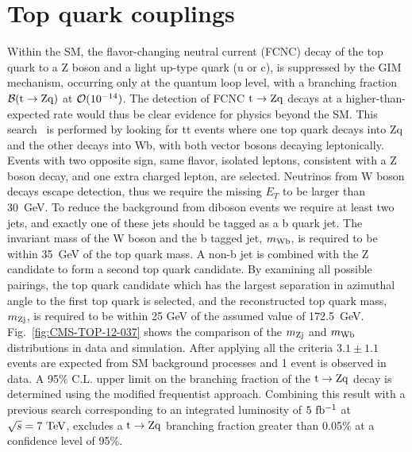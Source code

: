 \documentclass[a4paper]{PoS}
\begin{document}
\section{Top quark couplings}

Within the SM, the flavor-changing neutral current (FCNC) decay of the top quark
to a Z boson and a light up-type quark (u or c), is suppressed by the GIM mechanism,
occurring only at the quantum loop level, with a branching fraction
${\cal B}({\rm t \to Zq})$ at ${\cal O}(10^{-14})$. The detection of FCNC
${\rm t \to Zq}$ decays at a higher-than-expected rate would thus be clear evidence
for physics beyond the SM.
This search~\cite{CMS_tZq_8TeV} is performed by looking for tt events where one top
quark decays into Zq and the other decays into Wb, with both vector bosons decaying
leptonically.
Events with two opposite sign, same flavor, isolated leptons, consistent with a Z boson
decay, and one extra charged lepton, are selected. Neutrinos from W boson decays escape
detection, thus we require the missing $E_{T}$ to be larger than 30~GeV.
To reduce the background from diboson events
we require at least two jets, and exactly one of these jets should be tagged
as a b quark jet.
The invariant mass of the W boson and the b tagged jet, $m_{\rm Wb}$, is required to be
within 35~GeV of the top quark mass. A non-b jet is combined with the Z candidate to form
a second top quark candidate. By examining all possible pairings, the top quark candidate
which has the largest separation in azimuthal angle to the first top quark is selected,
and the reconstructed top quark mass, $m_{\rm Zj}$, is required to be within 25 GeV of the
assumed value of 172.5~GeV. Fig.~\ref{fig:CMS-TOP-12-037} shows the comparison of the
$m_{\rm Zj}$ and $m_{\rm Wb}$ distributions in data and simulation.
After applying all the criteria $3.1 \pm 1.1$ events are expected from SM background
processes and 1 event is observed in data. A 95\%  C.L. upper limit on the branching
fraction of the ${\rm t \to Zq}$ decay  is  determined  using  the  modified frequentist
approach. Combining this result with a previous search corresponding to an integrated
luminosity of $5~{\rm fb^{-1}}$ at $\sqrt{s} = 7~{\rm TeV}$, excludes a
${\rm t \to Zq}$ branching fraction greater than 0.05\% at a confidence level
of 95\%.
\end{document}
